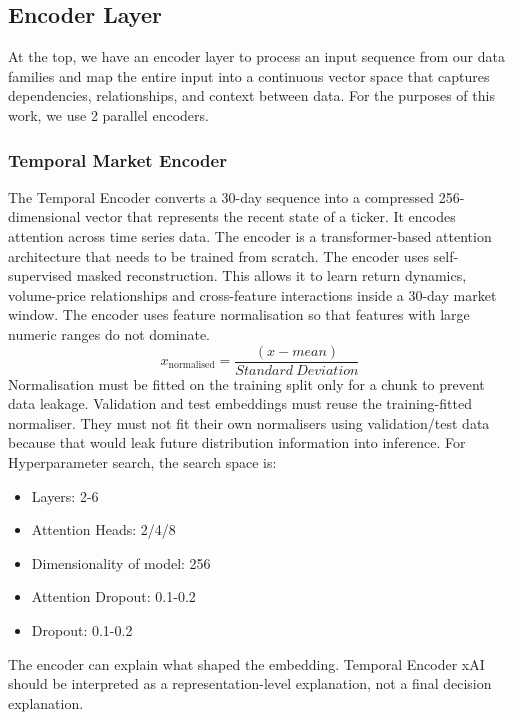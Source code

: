 \documentclass[conference]{IEEEtran}
\begin{document}
\subsection{Encoder Layer}
At the top, we have an encoder layer to process an input sequence from our data families and map the entire input into a continuous vector space that captures dependencies, relationships, and context between data. For the purposes of this work, we use 2 parallel encoders.
\subsubsection{Temporal Market Encoder}
The Temporal Encoder converts a 30-day sequence into a compressed 256-dimensional vector that represents the recent state of a ticker. It encodes attention across time series data. The encoder is a transformer-based attention architecture that needs to be trained from scratch. The encoder uses self-supervised masked reconstruction. This allows it to learn return dynamics, volume-price relationships and cross-feature interactions inside a 30-day market window. The encoder uses feature normalisation so that features with large numeric ranges do not dominate. 
\begin{equation}
x_\text{normalised} = \frac{(x-mean)}{Standard\ Deviation}\label{eq}
\end{equation}
Normalisation must be fitted on the training split only for a chunk to prevent data leakage. Validation and test embeddings must reuse the training-fitted normaliser. They must not fit their own normalisers using validation/test data because that would leak future distribution information into inference. For Hyperparameter search, the search space is:
\begin{itemize}
    \item Layers: 2-6
    \item Attention Heads: 2/4/8
    \item Dimensionality of model: 256
    \item Attention Dropout: 0.1-0.2
    \item Dropout: 0.1-0.2  
\end{itemize}
The encoder can explain what shaped the embedding. Temporal Encoder xAI should be interpreted as a representation-level explanation, not a final decision explanation. 
\end{document}
